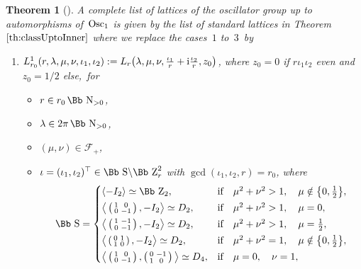 \documentclass[10pt,a4paper]{amsart}
\newcommand\NN{{\mbox{\Bb N}}}
\newcommand\ZZ{{\mbox{\Bb Z}}}
\newcommand\SSS{{\mbox{\Bb S}}}
\newcommand\cF{{\mathcal F}}
\newcommand{\Osc}{{\rm Osc}}
\numberwithin{equation}{section}
\newtheorem{Theorem}{Theorem}[section]
\begin{document}
\begin{Theorem}[\cite{F}]
A complete list of lattices of the oscillator group up to automorphisms of~$\Osc_1$ is given by the list of standard lattices in Theorem~$\ref{th:classUptoInner}$ where we replace the cases~$1$ to~$3$~by
\begin{enumerate}\itemsep=0pt
\item[$1.$] $L^1_{r_0}(r,\lambda,\mu,\nu,\iota_1,\iota_2):= L_r\big(\lambda,\mu,\nu,\frac{\iota_1}{r}+{\rm i}\frac{\iota_2}{r},z_0\big)$, where $z_0=0$ if $r\iota_1\iota_2$ even and $z_0=1/2$ else,~for
\begin{itemize}
\item[$\circ$] $r\in r_0\,\NN_{>0}$,
\item[$\circ$] $\lambda\in 2\pi\,\NN_{>0}$,
\item[$\circ$] $(\mu,\nu)\in\cF_+$,
\item[$\circ$] $\iota=(\iota_1,\iota_2)^\top\in\SSS\backslash\ZZ^2_r$ with $\gcd(\iota_1,\iota_2,r)=r_0$, where
\begin{gather*}
\SSS=\begin{cases}
\langle-I_2\rangle\simeq \ZZ_2, & \text{if}\quad \mu^2+\nu^2>1,\quad \mu\notin\big\{0,\frac{1}{2}\big\},
\\[0.5ex]
\big\langle \left(\begin{smallmatrix}1&0\\0&-1\end{smallmatrix}\right),-I_2\big\rangle \simeq D_2,& \text{if}\quad \mu^2+\nu^2>1,\quad \mu=0,
\\[0.5ex]
\big\langle \left(\begin{smallmatrix}1&-1\\0&-1\end{smallmatrix}\right),-I_2\big\rangle\simeq D_2, & \text{if}\quad \mu^2+\nu^2>1,\quad \mu=\frac{1}{2},
\\[0.5ex]
\big\langle \left(\begin{smallmatrix}0&1\\1&0\end{smallmatrix}\right),-I_2\big\rangle\simeq D_2, & \text{if}\quad \mu^2+\nu^2=1,\quad \mu\notin\big\{0,\frac{1}{2}\big\},
\\[0.5ex]
\big\langle \left(\begin{smallmatrix}1&0\\0&-1\end{smallmatrix}\right),\left(\begin{smallmatrix}0&-1\\1&0\end{smallmatrix}\right)\big\rangle\simeq D_4, & \text{if}\quad \mu=0,\quad \nu=1,

\end{cases}
\end{gather*}
\end{itemize}
\end{enumerate}
\end{Theorem}
\end{document}
